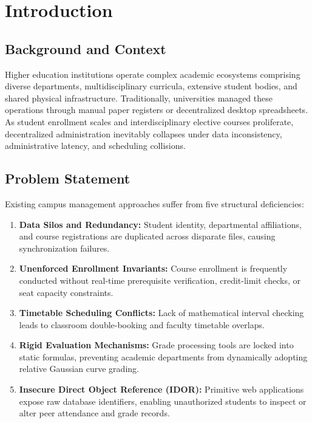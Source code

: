 \documentclass[12pt,a4paper,oneside]{report}
\begin{document}
\newpage
\tableofcontents
\newpage
\listoffigures
\newpage
\listoftables

\newpage
{}
\chapter{Introduction}

\section{Background and Context}
Higher education institutions operate complex academic ecosystems comprising diverse departments, multidisciplinary curricula, extensive student bodies, and shared physical infrastructure. Traditionally, universities managed these operations through manual paper registers or decentralized desktop spreadsheets. As student enrollment scales and interdisciplinary elective courses proliferate, decentralized administration inevitably collapses under data inconsistency, administrative latency, and scheduling collisions.

\section{Problem Statement}
Existing campus management approaches suffer from five structural deficiencies:
\begin{enumerate}
    \item \textbf{Data Silos and Redundancy:} Student identity, departmental affiliations, and course registrations are duplicated across disparate files, causing synchronization failures.
    \item \textbf{Unenforced Enrollment Invariants:} Course enrollment is frequently conducted without real-time prerequisite verification, credit-limit checks, or seat capacity constraints.
    \item \textbf{Timetable Scheduling Conflicts:} Lack of mathematical interval checking leads to classroom double-booking and faculty timetable overlaps.
    \item \textbf{Rigid Evaluation Mechanisms:} Grade processing tools are locked into static formulas, preventing academic departments from dynamically adopting relative Gaussian curve grading.
    \item \textbf{Insecure Direct Object Reference (IDOR):} Primitive web applications expose raw database identifiers, enabling unauthorized students to inspect or alter peer attendance and grade records.
\end{enumerate}
\end{document}
